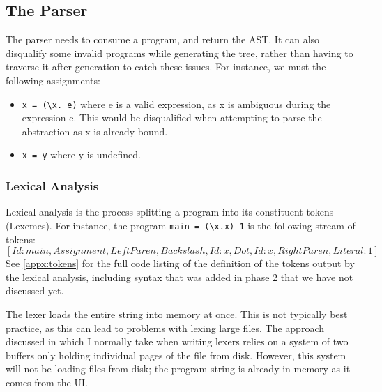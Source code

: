 

\subsection{The Parser}
The parser needs to consume a program, and return the AST. It can also disqualify some invalid programs while generating the tree, rather than having to traverse it after generation to catch these issues. For instance, we must the following assignments:
\begin{itemize}
    \item \verb|x = (\x. e)| where e is a valid expression, as x is ambiguous during the expression e. This would be disqualified when attempting to parse the abstraction as x is already bound.  
    \item \verb|x = y| where y is undefined.
\end{itemize}


\subsubsection{Lexical Analysis}
Lexical analysis is the process splitting a program into its constituent tokens (Lexemes). For instance, the program \verb|main = (\x.x) 1| is the following stream of tokens: \[[Id: main, Assignment, LeftParen, Backslash, Id: x, Dot, Id: x, RightParen, Literal: 1]\]
See \ref{appx:tokens} for the full code listing of the definition of the tokens output by the lexical analysis, including syntax that was added in phase 2 that we have not discussed yet.

The lexer loads the entire string into memory at once. This is not typically best practice, as this can lead to problems with lexing large files. The approach discussed in \cite{dragon_book} which I normally take when writing lexers relies on a system of two buffers only holding individual pages of the file from disk. However, this system will not be loading files from disk; the program string is already in memory as it comes from the UI. 

